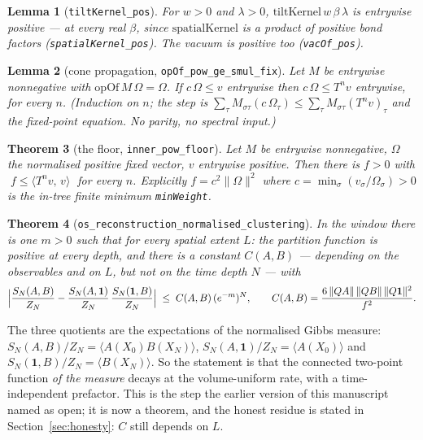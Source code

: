 \documentclass[11pt]{article}
\newtheorem{theorem}{Theorem}[section]
\newtheorem{lemma}[theorem]{Lemma}
\newcommand{\lean}[1]{\texttt{#1}}
\newcommand{\ip}[2]{\langle #1,\,#2\rangle}
\begin{document}
\begin{lemma}[\lean{tiltKernel\_pos}]
For $w>0$ and $\lambda>0$, $\mathrm{tiltKernel}\,w\,\beta\,\lambda$ is
entrywise positive --- at \emph{every} real $\beta$, since
$\mathrm{spatialKernel}$ is a product of positive bond factors
(\lean{spatialKernel\_pos}).  The vacuum is positive too
(\lean{vacOf\_pos}).
\end{lemma}

\begin{lemma}[cone propagation, \lean{opOf\_pow\_ge\_smul\_fix}]
Let $M$ be entrywise nonnegative with $\mathrm{opOf}\,M\,\Omega =
\Omega$.  If $c\,\Omega \le v$ entrywise then $c\,\Omega \le T^n v$
entrywise, for every $n$.  (Induction on $n$; the step is
$\sum_\tau M_{\sigma\tau}(c\,\Omega_\tau) \le
\sum_\tau M_{\sigma\tau}(T^n v)_\tau$ and the fixed-point equation.
No parity, no spectral input.)
\end{lemma}

\begin{theorem}[the floor, \lean{inner\_pow\_floor}]
Let $M$ be entrywise nonnegative, $\Omega$ the normalised positive
fixed vector, $v$ entrywise positive.  Then there is $f>0$ with
$\;f \le \ip{T^n v}{v}\;$ for \emph{every} $n$.  Explicitly
$f = c^2\lVert\Omega\rVert^2$ where $c = \min_\sigma
(v_\sigma/\Omega_\sigma) > 0$ is the in-tree finite minimum
\lean{minWeight}.
\end{theorem}

\begin{theorem}[\lean{os\_reconstruction\_normalised\_clustering}]
In the window there is \emph{one} $m>0$ such that for \emph{every}
spatial extent $L$: the partition function is positive at every depth,
and there is a constant $C(A,B)$ --- depending on the observables and
on $L$, but \emph{not} on the time depth $N$ --- with
\[
\Bigl| \frac{S_N(A,B)}{Z_N}
  - \frac{S_N(A,\mathbf 1)}{Z_N}\,\frac{S_N(\mathbf 1,B)}{Z_N} \Bigr|
\;\le\; C(A,B)\,(e^{-m})^N ,
\qquad
C(A,B) = \frac{6\,\lVert QA\rVert\,\lVert QB\rVert\,
  \lVert Q\mathbf 1\rVert^2}{f^2} .
\]
\end{theorem}

The three quotients are the expectations of the normalised Gibbs
measure: $S_N(A,B)/Z_N = \langle A(X_0)B(X_N)\rangle$,
$S_N(A,\mathbf 1)/Z_N = \langle A(X_0)\rangle$ and
$S_N(\mathbf 1,B)/Z_N = \langle B(X_N)\rangle$.  So the statement is
that the connected two-point function \emph{of the measure} decays at
the volume-uniform rate, with a time-independent prefactor.  This is
the step the earlier version of this manuscript named as open; it is
now a theorem, and the honest residue is stated in
Section~\ref{sec:honesty}: $C$ still depends on $L$.
\end{document}
